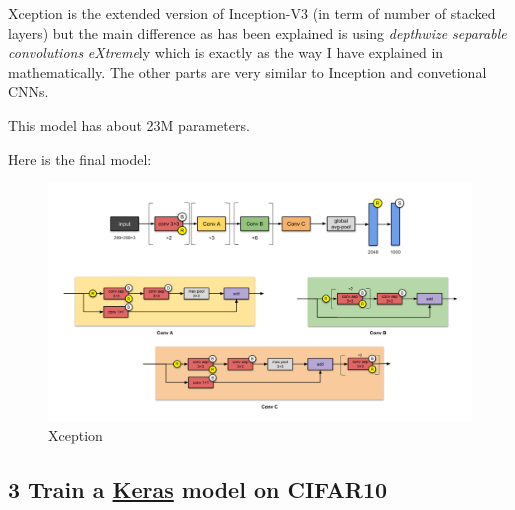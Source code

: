 \documentclass[11pt]{article}
\makeatletter
\def\maxwidth{\ifdim\Gin@nat@width>\linewidth\linewidth
    \else\Gin@nat@width\fi}
\let\Oldincludegraphics\includegraphics
\renewcommand{\includegraphics}[1]{\Oldincludegraphics[width=.8\maxwidth]{#1}}
\makeatother
\begin{document}
Xception is the extended version of Inception-V3 (in term of number of
stacked layers) but the main difference as has been explained is using
\emph{depthwize separable convolutions} \emph{eXtreme}ly which is
exactly as the way I have explained in mathematically. The other parts
are very similar to Inception and convetional CNNs.

This model has about 23M parameters.

Here is the final model:

\begin{figure}
\centering
\includegraphics{wiki/2_7.png}
\caption{Xception}
\end{figure}

    \hypertarget{train-a-keras-model-on-cifar10}{%
\subsection{\texorpdfstring{3 Train a \href{https://keras.io/}{Keras}
model on
CIFAR10}{3 Train a Keras model on CIFAR10}}\label{train-a-keras-model-on-cifar10}}
\end{document}
